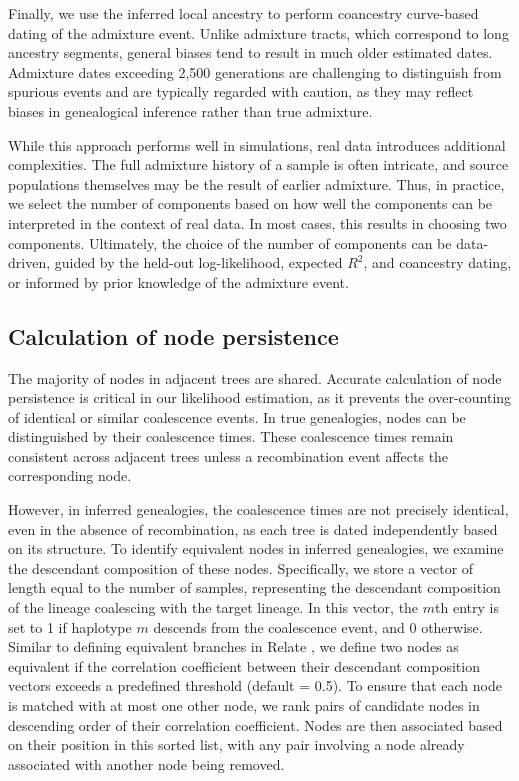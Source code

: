 Finally, we use the inferred local ancestry to perform coancestry curve-based dating of the admixture event. Unlike admixture tracts, which correspond to long ancestry segments, general biases tend to result in much older estimated dates. Admixture dates exceeding 2,500 generations are challenging to distinguish from spurious events and are typically regarded with caution, as they may reflect biases in genealogical inference rather than true admixture.

While this approach performs well in simulations, real data introduces additional complexities. The full admixture history of a sample is often intricate, and source populations themselves may be the result of earlier admixture. Thus, in practice, we select the number of components based on how well the components can be interpreted in the context of real data. In most cases, this results in choosing two components. Ultimately, the choice of the number of components can be data-driven, guided by the held-out log-likelihood, expected $R^2$, and coancestry dating, or informed by prior knowledge of the admixture event.

\subsection{Calculation of node persistence}
\label{sec:ch2-gb-node-persistence}
The majority of nodes in adjacent trees are shared. Accurate calculation of node persistence is critical in our likelihood estimation, as it prevents the over-counting of identical or similar coalescence events. In true genealogies, nodes can be distinguished by their coalescence times. These coalescence times remain consistent across adjacent trees unless a recombination event affects the corresponding node.

However, in inferred genealogies, the coalescence times are not precisely identical, even in the absence of recombination, as each tree is dated independently based on its structure. To identify equivalent nodes in inferred genealogies, we examine the descendant composition of these nodes. Specifically, we store a vector of length equal to the number of samples, representing the descendant composition of the lineage coalescing with the target lineage. In this vector, the $m$th entry is set to 1 if haplotype $m$ descends from the coalescence event, and 0 otherwise. Similar to defining equivalent branches in Relate \cite{speidel2019method}, we define two nodes as equivalent if the correlation coefficient between their descendant composition vectors exceeds a predefined threshold (default = 0.5). To ensure that each node is matched with at most one other node, we rank pairs of candidate nodes in descending order of their correlation coefficient. Nodes are then associated based on their position in this sorted list, with any pair involving a node already associated with another node being removed.

